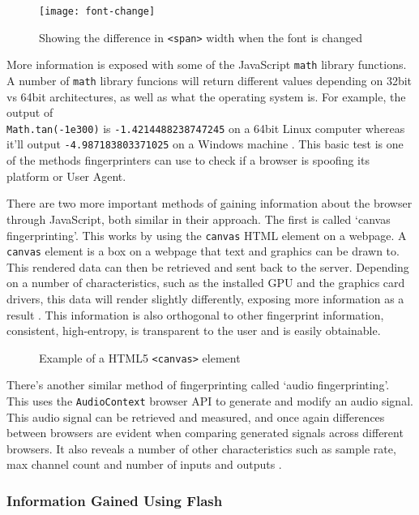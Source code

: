 \begin{figure}[h]
\caption{Showing the difference in \texttt{<span>} width when the font is changed}
\texttt{[image: font-change]}
\centering
\label{fig:font-change}
\end{figure}

More information is exposed with some of the JavaScript \texttt{math} library functions.
A number of \texttt{math} library funcions will return different values depending on 32bit vs 64bit architectures, as well as what the operating system is.
For example, the output of \\
\texttt{Math.tan(-1e300)} is \texttt{-1.4214488238747245} on a 64bit Linux computer whereas it'll output \texttt{-4.987183803371025} on a Windows machine \citep{floating-point-bug}.
This basic test is one of the methods fingerprinters can use to check if a browser is spoofing its platform or User Agent.

There are two more important methods of gaining information about the browser through JavaScript, both similar in their approach.
The first is called `canvas fingerprinting'.
This works by using the \texttt{canvas} HTML element on a webpage.
A \texttt{canvas} element is a box on a webpage that text and graphics can be drawn to.
This rendered data can then be retrieved and sent back to the server.
Depending on a number of characteristics, such as the installed GPU and the graphics card drivers, this data will render slightly differently, exposing more information as a result \citep{canvas-fingerprint}.
This information is also orthogonal to other fingerprint information, consistent, high-entropy, is transparent to the user and is easily obtainable.

\begin{figure}[h]
\caption{Example of a HTML5 \texttt{<canvas>} element}
\centering
\label{fig:canvas-example}
\end{figure}

There's another similar method of fingerprinting called `audio fingerprinting'.
This uses the \texttt{AudioContext} browser API to generate and modify an audio signal.
This audio signal can be retrieved and measured, and once again differences between browsers are evident when comparing generated signals across different browsers.
It also reveals a number of other characteristics such as sample rate, max channel count and number of inputs and outputs \citep{audio-fingerprint}.

\subsubsection{Information Gained Using Flash}

